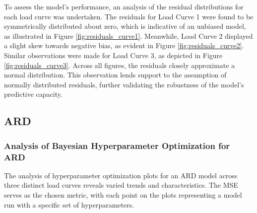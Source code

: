 \documentclass{article} %
\begin{document}
To assess the model's performance, an analysis of the residual distributions for each load curve was undertaken. The residuals for Load Curve 1 were found to be symmetrically distributed about zero, which is indicative of an unbiased model, as illustrated in Figure \ref{fig:residuals_curve1}. 
Meanwhile, Load Curve 2 displayed a slight skew towards negative bias, as evident in Figure \ref{fig:residuals_curve2}. Similar observations were made for Load Curve 3, as depicted in Figure \ref{fig:residuals_curve3}. Across all figures, the residuals closely approximate a normal distribution. This observation lends support to the assumption of normally distributed residuals, further validating the robustness of the model's predictive capacity.

\subsection{ARD}
\subsubsection{Analysis of Bayesian Hyperparameter Optimization for ARD}
The analysis of hyperparameter optimization plots for an \gls*{ARD} model across three distinct load curves reveals varied trends and characteristics. The \gls*{MSE} serves as the chosen metric, with each point on the plots representing a model run with a specific set of hyperparameters. 
\end{document}
